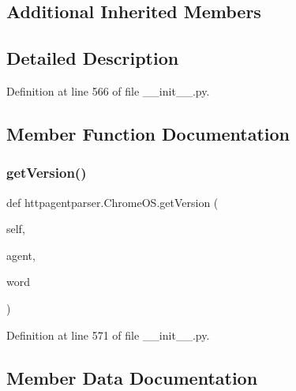 \subsection*{Additional Inherited Members}


\subsection{Detailed Description}


Definition at line 566 of file \+\_\+\+\_\+init\+\_\+\+\_\+.\+py.



\subsection{Member Function Documentation}
\hypertarget{classhttpagentparser_1_1_chrome_o_s_a176ef37b2732253083cc283e550f4d45}{}\label{classhttpagentparser_1_1_chrome_o_s_a176ef37b2732253083cc283e550f4d45} 
\subsubsection{\texorpdfstring{get\+Version()}{getVersion()}}
{\footnotesize\ttfamily def httpagentparser.\+Chrome\+O\+S.\+get\+Version (\begin{DoxyParamCaption}\item[{}]{self,  }\item[{}]{agent,  }\item[{}]{word }\end{DoxyParamCaption})}



Definition at line 571 of file \+\_\+\+\_\+init\+\_\+\+\_\+.\+py.



\subsection{Member Data Documentation}
\hypertarget{classhttpagentparser_1_1_chrome_o_s_ae319b452a81e7394b07a1ba05d3e0acc}{}\label{classhttpagentparser_1_1_chrome_o_s_ae319b452a81e7394b07a1ba05d3e0acc} 
